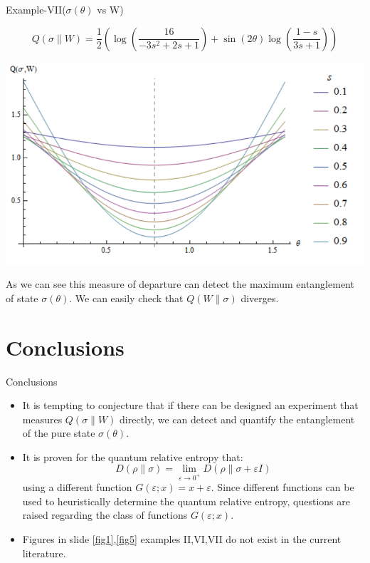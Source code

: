 \documentclass{beamer}
\begin{document}
\begin{frame}{Example-VII($\sigma(\theta)$ vs W)}
\begin{scriptsize}
\begin{equation*}
Q(\sigma\|W)=\frac{1}{2} \left(\log \left(\frac{16}{-3 s^2+2 s+1}\right)+\sin (2 \theta ) \log \left(\frac{1-s}{3 s+1}\right)\right)
\end{equation*}
\begin{center}
\includegraphics[scale=0.5]{figures/PureMixedRelativeEntropy.png}\label{fig5}
\end{center}
As we can see this measure of departure can detect the maximum entanglement of state $\sigma(\theta)$. We can easily check that $Q(W\|\sigma)$ diverges.
\end{scriptsize}
\end{frame}

\section{Conclusions}
\begin{frame}{Conclusions}
\begin{scriptsize}
\begin{itemize}
\item It is tempting to conjecture that if there can be designed an experiment that measures $Q(\sigma\|W)$ directly, we can detect and quantify the entanglement of the pure state $\sigma(\theta)$.
\item It is proven for the quantum relative entropy that:
\begin{equation*}
D(\rho \| \sigma)=\lim _{\varepsilon \to 0^{+}} D(\rho \| \sigma+\varepsilon I)
\end{equation*}
using a different function $G(\varepsilon ;x)=x+\varepsilon$. Since different functions can be used to heuristically determine the quantum relative entropy, questions are raised regarding the class of functions $G(\varepsilon;x)$.
\item Figures in slide \ref{fig1},\ref{fig5} examples II,VI,VII do not exist in the current literature. 
\end{itemize}
\end{scriptsize}
\end{frame}
\end{document}
